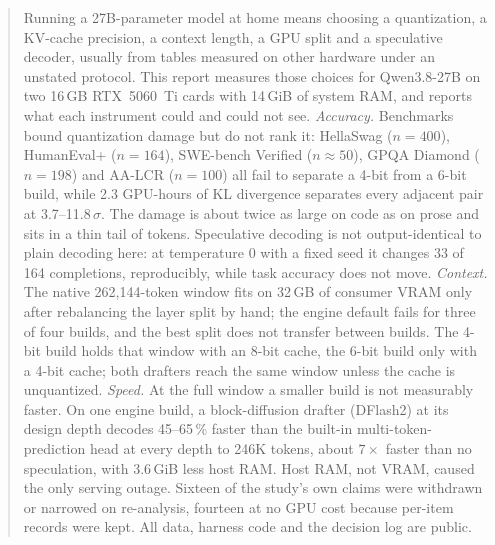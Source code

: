 \begin{abstract}
\noindent
Running a 27B-parameter model at home means choosing a quantization, a KV-cache precision, a context
length, a GPU split and a speculative decoder, usually from tables measured on other hardware
under an unstated protocol. This report measures those choices for Qwen3.8-27B on two 16\,GB
RTX~5060~Ti cards with 14\,GiB of system RAM, and reports what each instrument could and could not see.
\emph{Accuracy.} Benchmarks bound quantization damage but do not rank it: HellaSwag ($n{=}400$),
HumanEval+ ($n{=}164$), SWE-bench Verified ($n{\approx}50$), GPQA Diamond ($n{=}198$) and AA-LCR
($n{=}100$) all fail to separate a 4-bit from a 6-bit build, while 2.3 GPU-hours of KL divergence
separates every adjacent pair at 3.7--11.8\,$\sigma$. The damage is about twice as large
on code as on prose and sits in a thin tail of tokens. Speculative decoding is not output-identical
to plain decoding here: at temperature 0 with a fixed seed it changes 33 of 164 completions,
reproducibly, while task accuracy does not move.
\emph{Context.} The native 262{,}144-token window fits on 32\,GB of consumer VRAM only after
rebalancing the layer split by hand; the engine default fails for three of four builds, and the best
split does not transfer between builds. The 4-bit build holds that window with an 8-bit cache, the
6-bit build only with a 4-bit cache; both drafters reach the same window unless the cache
is unquantized.
\emph{Speed.} At the full window a smaller build is not measurably faster. On one engine build, a
block-diffusion drafter (DFlash2) at its design depth decodes 45--65\,\% faster than the built-in
multi-token-prediction head at every depth to 246K tokens, about $7\times$ faster than no speculation,
with 3.6\,GiB less host RAM. Host RAM, not VRAM, caused the only serving outage.
Sixteen of the study's own claims were withdrawn or narrowed on re-analysis, fourteen at no GPU cost
because per-item records were kept. All data, harness code and the decision log are public.
\end{abstract}
